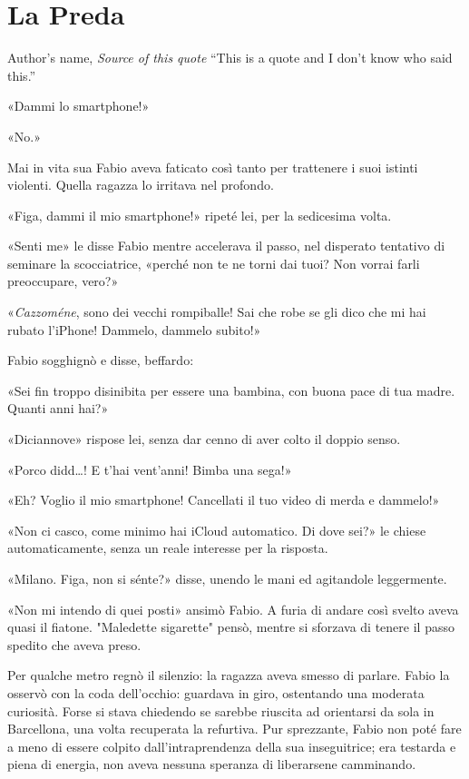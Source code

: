 \chapter{La Preda}

\begin{chapquote}{Author's name, \textit{Source of this quote}}
``This is a quote and I don't know who said this.''
\end{chapquote}


«Dammi lo smartphone!»

«No.»

Mai in vita sua Fabio aveva faticato così tanto per trattenere i suoi istinti violenti. Quella ragazza lo irritava nel profondo.

«Figa, dammi il mio smartphone!» ripeté lei, per la sedicesima volta.

«Senti me» le disse Fabio mentre accelerava il passo, nel disperato tentativo di seminare la scocciatrice, «perché non te ne torni dai tuoi? Non vorrai farli preoccupare, vero?»

«\emph{Cazzoméne}, sono dei vecchi rompiballe! Sai che robe se gli dico che mi hai rubato l'iPhone! Dammelo, dammelo subito!»

Fabio sogghignò e disse, beffardo:

«Sei fin troppo disinibita per essere una bambina, con buona pace di tua madre. Quanti anni hai?»

«Diciannove» rispose lei, senza dar cenno di aver colto il doppio senso.

«Porco didd\ldots! E t'hai vent'anni! Bimba una sega!»

«Eh? Voglio il mio smartphone! Cancellati il tuo video di merda e dammelo!»

«Non ci casco, come minimo hai iCloud automatico. Di dove sei?» le chiese automaticamente, senza un reale interesse per la risposta.

«Milano. Figa, non si sénte?» disse, unendo le mani ed agitandole leggermente.

«Non mi intendo di quei posti» ansimò Fabio. A furia di andare così svelto aveva quasi il fiatone. "Maledette sigarette" pensò, mentre si sforzava di tenere il passo spedito che aveva preso.

Per qualche metro regnò il silenzio: la ragazza aveva smesso di parlare. Fabio la osservò con la coda dell'occhio: guardava in giro, ostentando una moderata curiosità. Forse si stava chiedendo se sarebbe riuscita ad orientarsi da sola in Barcellona, una volta recuperata la refurtiva. Pur sprezzante, Fabio non poté fare a meno di essere colpito dall'intraprendenza della sua inseguitrice; era testarda e piena di energia, non aveva nessuna speranza di liberarsene camminando.

